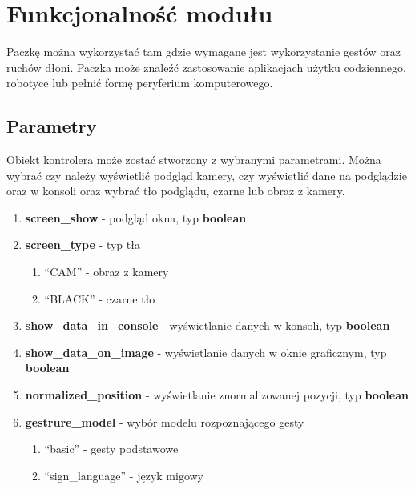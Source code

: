 \section{Funkcjonalność modułu}
\quad Paczkę można wykorzystać tam gdzie wymagane jest wykorzystanie gestów oraz ruchów dłoni. Paczka może znaleźć zastosowanie aplikacjach użytku codziennego, robotyce lub pełnić formę peryferium komputerowego.  

\subsection{Parametry}
\quad Obiekt kontrolera może zostać stworzony z wybranymi parametrami. Można wybrać czy należy wyświetlić podgląd kamery, czy wyświetlić dane na podglądzie oraz w konsoli oraz wybrać tło podglądu, czarne lub obraz z kamery. 


\begin{enumerate}
    \item \textbf{screen\_show} - podgląd okna, typ \textbf{boolean}
    \item \textbf{screen\_type} - typ tła
    \begin{enumerate}
        \item \enquote{CAM} - obraz z kamery
        \item \enquote{BLACK} - czarne tło
    \end{enumerate}
    \item \textbf{show\_data\_in\_console} - wyświetlanie danych w konsoli, typ \textbf{boolean}
    \item \textbf{show\_data\_on\_image} - wyświetlanie danych w oknie graficznym, typ \textbf{boolean}
    \item \textbf{normalized\_position} - wyświetlanie znormalizowanej pozycji, typ \textbf{boolean}
    \item \textbf{gestrure\_model} - wybór modelu rozpoznającego gesty
    \begin{enumerate}
        \item \enquote{basic} - gesty podstawowe
        \item \enquote{sign\_language} - język migowy
    \end{enumerate}
\end{enumerate}


